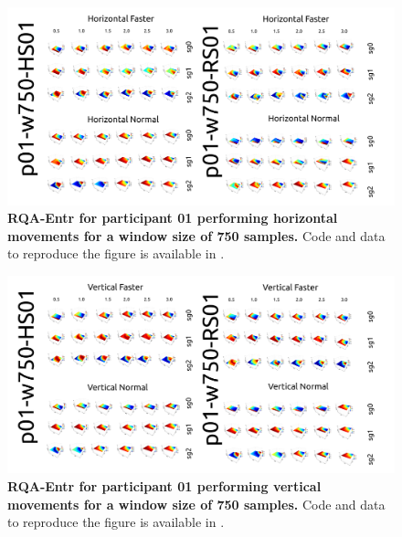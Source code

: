 \documentclass[12pt]{article}
\begin{document}
\newpage
\begin{figure}[ht!]
\centering
\includegraphics{figures/rqa/output/epsilons/rqa-epsilonsp01w750Horizontal}
    	\caption{
	{\bf RQA-Entr for participant 01 performing horizontal movements for a window size of 750 samples.}
	Code and data to reproduce the figure is available in \cite{srep2021}.
        }
    \label{fig-p01-H-w750}
\end{figure}
\begin{figure}[hb!]
\centering
\includegraphics{figures/rqa/output/epsilons/rqa-epsilonsp01w750Vertical}
    	\caption{
	{\bf RQA-Entr for participant 01 performing vertical movements for a window size of 750 samples.}
	Code and data to reproduce the figure is available in \cite{srep2021}.
        }
    \label{fig-p01-V-w750}
\end{figure}
\end{document}
